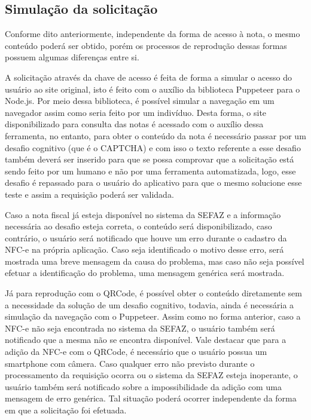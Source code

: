 \subsection{Simulação da solicitação}

Conforme dito anteriormente, independente da forma de acesso à nota, o mesmo conteúdo poderá ser obtido, porém os processos de reprodução dessas formas possuem algumas diferenças entre si.

A solicitação através da chave de acesso é feita de forma a simular o acesso do usuário ao site original, isto é feito com o auxílio da biblioteca Puppeteer para o Node.js. Por meio dessa biblioteca, é possível simular a navegação em um navegador assim como seria feito por um indivíduo. Desta forma, o site disponibilizado para consulta das notas é acessado com o auxílio dessa ferramenta, no entanto, para obter o conteúdo da nota é necessário passar por um desafio cognitivo (que é o CAPTCHA) e com isso o texto referente a esse desafio também deverá ser inserido para que se possa comprovar que a solicitação está sendo feito por um humano e não por uma ferramenta automatizada, logo, esse desafio é repassado para o usuário do aplicativo para que o mesmo solucione esse teste e assim a requisição poderá ser validada.

Caso a nota fiscal já esteja disponível no sistema da SEFAZ e a informação necessária ao desafio esteja correta, o conteúdo será disponibilizado, caso contrário, o usuário será notificado que houve um erro durante o cadastro da NFC-e na própria aplicação. Caso seja identificado o motivo desse erro, será mostrada uma breve mensagem da causa do problema, mas caso não seja possível efetuar a identificação do problema, uma mensagem genérica será mostrada.

Já para reprodução com o QRCode, é possível obter o conteúdo diretamente sem a necessidade da solução de um desafio cognitivo, todavia, ainda é necessária a simulação da navegação com o Puppeteer. Assim como no forma anterior, caso a NFC-e não seja encontrada no sistema da SEFAZ, o usuário também será notificado que a mesma não se encontra disponível. Vale destacar que para a adição da NFC-e com o QRCode, é necessário que o usuário possua um smartphone com câmera. Caso qualquer erro não previsto durante o processamento da requisição ocorra ou o sistema da SEFAZ esteja inoperante, o usuário também será notificado sobre a impossibilidade da adição com uma mensagem de erro genérica. Tal situação poderá ocorrer independente da forma em que a solicitação foi efetuada.

